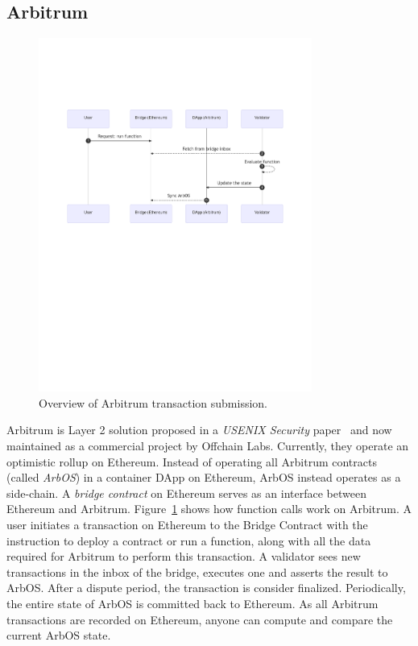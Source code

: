 \subsection{Arbitrum}

\begin{figure}[t]
	\centering
	\includegraphics[width=0.8\textwidth]{figures/arbitrum.pdf}
	\caption{Overview of Arbitrum transaction submission.}
	\label{fig:arbsys}
\end{figure}

Arbitrum is Layer 2 solution proposed in a \textit{USENIX Security} paper~\cite{KGCWF18} and now maintained as a commercial project by Offchain Labs. Currently, they operate an optimistic rollup on Ethereum. Instead of operating all Arbitrum contracts (called \emph{ArbOS}) in a container DApp on Ethereum, ArbOS instead operates as a side-chain. A  \emph{bridge contract} on Ethereum serves as an interface between Ethereum and Arbitrum. Figure~\ref{fig:arbsys} shows how function calls work on Arbitrum. A user initiates a transaction on Ethereum to the Bridge Contract with the instruction to deploy a contract or run a function, along with all the data required for Arbitrum to perform this transaction. A validator sees new transactions in the inbox of the bridge, executes one and asserts the result to ArbOS. After a dispute period, the transaction is consider finalized. Periodically, the entire state of ArbOS is committed back to Ethereum. As all Arbitrum transactions are recorded on Ethereum, anyone can compute and compare the current ArbOS state.  

